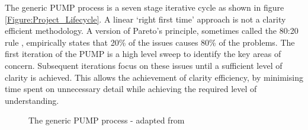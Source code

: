 The generic PUMP process is a seven stage iterative cycle as shown in figure \ref{Figure:Project_Lifecycle}. 
A linear `right first time' approach is not a clarity efficient methodology.
A version of Pareto's principle, sometimes called the 80:20 rule \citep{Pareto1992}, empirically states that 20\% of the issues causes 80\% of the problems. 
The first iteration of the PUMP is a high level sweep to identify the key areas of concern.
Subsequent iterations focus on these issues until a sufficient level of clarity is achieved.
This allows the achievement of clarity efficiency, by minimising time spent on unnecessary detail while achieving the required level of understanding.

\begin{figure}[!h]
  \centering
{} \quad
{}
\caption{The generic PUMP process - adapted from \cite{chapman}}
\label{Figure:GenericPUMP_Both}
\end{figure}

